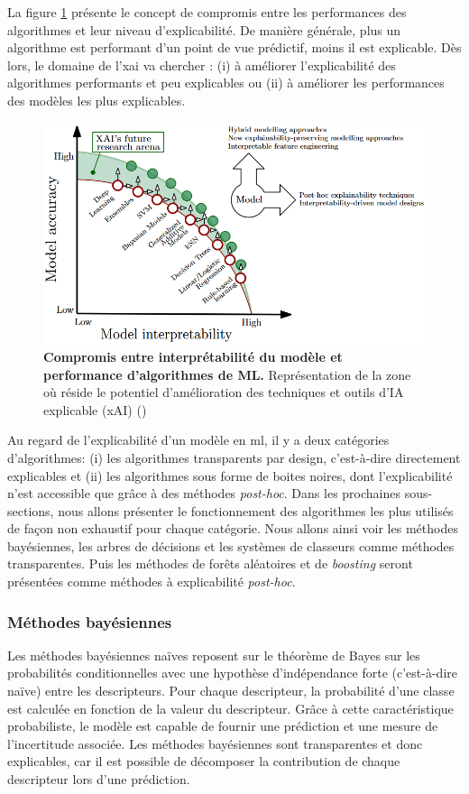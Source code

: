 La figure \ref{fig:xai-research} présente le concept de compromis entre les performances des algorithmes et leur niveau d'explicabilité. De manière générale, plus un algorithme est performant d'un point de vue prédictif, moins il est explicable. Dès lors, le domaine de l'\gls{xai} va chercher : (i) à améliorer l'explicabilité des algorithmes performants et peu explicables ou (ii) à améliorer les performances des modèles les plus explicables.
\begin{figure}[!htbp]
 \centering
 \includegraphics[width=1\textwidth]{figures/xai-research.png}
 \caption[Compromis entre interprétabilité et performances des algo de ML]{\textbf{Compromis entre interprétabilité du modèle et performance d'algorithmes de ML.} Représentation de la zone où réside le potentiel d'amélioration des techniques et outils d'IA explicable (xAI) (\cite{arrieta_explainable_2019})}
 \label{fig:xai-research}
\end{figure}

Au regard de l'explicabilité d'un modèle en \gls{ml}, il y a deux catégories d'algorithmes: (i) les algorithmes transparents par design, c'est-à-dire directement explicables et (ii) les algorithmes sous forme de boites noires, dont l'explicabilité n'est accessible que grâce à des méthodes \textit{post-hoc}. Dans les prochaines sous-sections, nous allons présenter le fonctionnement des algorithmes les plus utilisés de façon non exhaustif pour chaque catégorie. Nous allons ainsi voir les méthodes bayésiennes, les arbres de décisions et les systèmes de classeurs comme méthodes transparentes. Puis les méthodes de forêts aléatoires et de \textit{boosting} seront présentées comme méthodes à explicabilité \textit{post-hoc}.

\subsubsection{Méthodes bayésiennes}
Les méthodes bayésiennes naïves reposent sur le théorème de Bayes sur les probabilités conditionnelles avec une hypothèse d'indépendance forte (c'est-à-dire naïve) entre les descripteurs. Pour chaque descripteur, la probabilité d'une classe est calculée en fonction de la valeur du descripteur. Grâce à cette caractéristique probabiliste, le modèle est capable de fournir une prédiction et une mesure de l'incertitude associée. Les méthodes bayésiennes sont transparentes et donc explicables, car il est possible de décomposer la contribution de chaque descripteur lors d'une prédiction.

